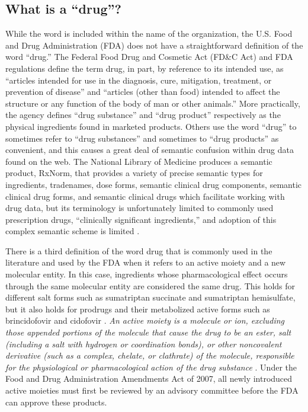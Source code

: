\documentclass{bioinfo}
\begin{document}
\subsection{What is a ``drug''?}
While the word is included within the name of the organization, the
U.S. Food and Drug Administration (FDA) does not have a
straightforward definition of the word ``drug.'' The Federal Food Drug
and Cosmetic Act (FD\&C Act) and FDA regulations define the term drug,
in part, by reference to its intended use, as ``articles intended for
use in the diagnosis, cure, mitigation, treatment, or prevention of
disease” and “articles (other than food) intended to affect the
structure or any function of the body of man or other
animals.'' \citep{FDADrug} More practically, the agency defines ``drug
substance'' and ``drug product'' respectively as the physical
ingredients found in marketed products. Others use the word ``drug''
to sometimes refer to ``drug substances'' and sometimes to ``drug
products'' as convenient, and this causes a great deal of semantic
confusion within drug data found on the web. The National Library of
Medicine produces a semantic product, RxNorm, that provides a variety
of precise semantic types for ingredients, tradenames, dose forms,
semantic clinical drug components, semantic clinical drug forms, and
semantic clinical drugs which facilitate working with drug data, but
its terminology is unfortunately limited to commonly used prescription
drugs, ``clinically significant ingredients,'' and adoption of this
complex semantic scheme is limited \citep{RxNorm}. 

There is a third definition of the word drug that is commonly used in
the literature and used by the FDA when it refers to an active moiety
and a new molecular entity. In this case, ingredients whose
pharmacological effect occurs through the same molecular entity are
considered the same drug. This holds for different salt forms such as
sumatriptan succinate and sumatriptan hemisulfate, but it also holds
for prodrugs and their metabolized active forms such as brincidofovir
and cidofovir \citep{NME}. \emph{An active moiety is a molecule or
ion, excluding those appended portions of the molecule that cause the
drug to be an ester, salt (including a salt with hydrogen or
coordination bonds), or other noncovalent derivative (such as a
complex, chelate, or clathrate) of the molecule, responsible for the
physiological or pharmacological action of the drug
substance} \citep{CFR2012}. Under the Food and Drug Administration
Amendments Act of 2007, all newly introduced active moieties must
first be reviewed by an advisory committee before the FDA can approve
these products.
\end{document}
